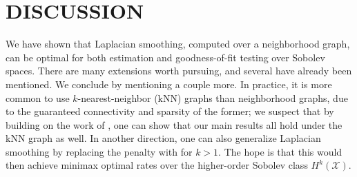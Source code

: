 \documentclass[twoside]{article}
\newcommand{\1}{\mathbf{1}}
\newcommand{\Lap}{L}
\newcommand{\Xset}{\mathcal{X}}
\theoremstyle{definition}
\theoremstyle{remark}
\begin{document}
\section{DISCUSSION}
\label{sec:discussion}

We have shown that Laplacian smoothing, computed over a neighborhood graph, can be optimal for both estimation and goodness-of-fit testing over Sobolev spaces. There are many extensions worth pursuing, and several have already been mentioned. We conclude by mentioning a couple more. In practice, it is more common to use $k$-nearest-neighbor (kNN) graphs than neighborhood graphs, due to the guaranteed connectivity and sparsity of the former; we suspect that by building on the work of \citet{calder2019}, one can show that our main results all hold under the kNN graph as well. In another direction, one can also generalize Laplacian smoothing by replacing the penalty \smash{$f^\top \Lap_{n,r} f$} with \smash{$f^\top \Lap_{n,r}^k f$} for $k > 1$. The hope is that this would then achieve minimax optimal rates over the higher-order Sobolev class $H^k(\Xset)$. %


 
\end{document}
